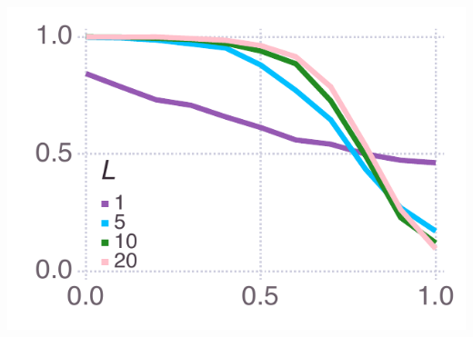 \documentclass[varwidth=true,crop=false]{standalone}
\begin{document}
	\begin{minipage}{3.75in}%
      \includegraphics[width=\textwidth]{mean_social_learner_over_u_lowpayoff=0.45_nbehaviors=10.pdf}
    \end{minipage}~\\[0.5em]
\end{document}
